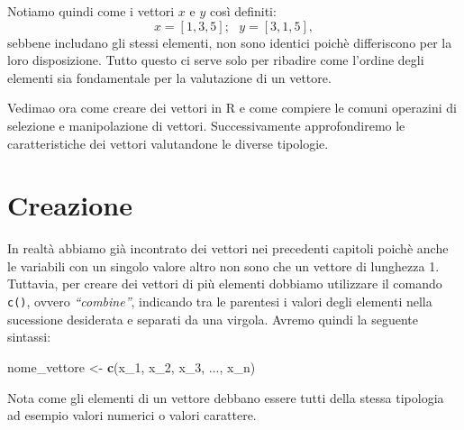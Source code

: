 \documentclass[
]{book}
\newenvironment{Shaded}{\begin{snugshade}}{\end{snugshade}}
\newcommand{\DecValTok}[1]{\textcolor[rgb]{0.00,0.00,0.81}{#1}}
\newcommand{\KeywordTok}[1]{\textcolor[rgb]{0.13,0.29,0.53}{\textbf{#1}}}
\newcommand{\NormalTok}[1]{#1}
\newcommand{\StringTok}[1]{\textcolor[rgb]{0.31,0.60,0.02}{#1}}
\begin{document}
Notiamo quindi come i vettori \(x\) e \(y\) così definiti:
\[
x = [1, 3, 5];\ \ \ y = [3, 1, 5],
\]
sebbene includano gli stessi elementi, non sono identici poichè differiscono per la loro disposizione. Tutto questo ci serve solo per ribadire come l'ordine degli elementi sia fondamentale per la valutazione di un vettore.

Vedimao ora come creare dei vettori in R e come compiere le comuni operazini di selezione e manipolazione di vettori. Successivamente approfondiremo le caratteristiche dei vettori valutandone le diverse tipologie.

\hypertarget{creazione}{%
\section{Creazione}\label{creazione}}

In realtà abbiamo già incontrato dei vettori nei precedenti capitoli poichè anche le variabili con un singolo valore altro non sono che un vettore di lunghezza 1. Tuttavia, per creare dei vettori di più elementi dobbiamo utilizzare il comando \texttt{c()}, ovvero \emph{``combine''}, indicando tra le parentesi i valori degli elementi nella sucessione desiderata e separati da una virgola. Avremo quindi la seguente sintassi:

\begin{Shaded}
\begin{Highlighting}[]
\NormalTok{nome_vettore <-}\StringTok{ }\KeywordTok{c}\NormalTok{(x_}\DecValTok{1}\NormalTok{, x_}\DecValTok{2}\NormalTok{, x_}\DecValTok{3}\NormalTok{, ..., x_n)}
\end{Highlighting}
\end{Shaded}

Nota come gli elementi di un vettore debbano essere tutti della stessa tipologia ad esempio valori numerici o valori carattere.
\end{document}
